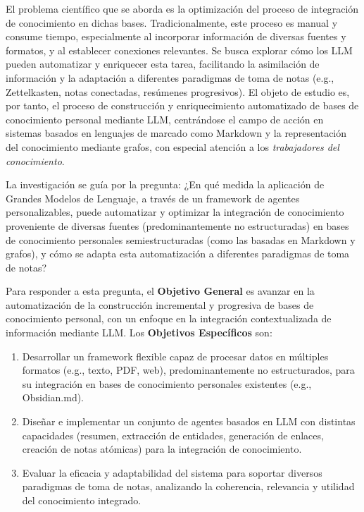 El problema científico que se aborda es la optimización del proceso de integración de conocimiento en dichas bases. Tradicionalmente, este proceso es manual y consume tiempo, especialmente al incorporar información de diversas fuentes y formatos, y al establecer conexiones relevantes. Se busca explorar cómo los LLM pueden automatizar y enriquecer esta tarea, facilitando la asimilación de información y la adaptación a diferentes paradigmas de toma de notas (e.g., Zettelkasten, notas conectadas, resúmenes progresivos). El objeto de estudio es, por tanto, el proceso de construcción y enriquecimiento automatizado de bases de conocimiento personal mediante LLM, centrándose el campo de acción en sistemas basados en lenguajes de marcado como Markdown y la representación del conocimiento mediante grafos, con especial atención a los \textit{trabajadores del conocimiento}.

La investigación se guía por la pregunta: ¿En qué medida la aplicación de Grandes Modelos de Lenguaje, a través de un framework de agentes personalizables, puede automatizar y optimizar la integración de conocimiento proveniente de diversas fuentes (predominantemente no estructuradas) en bases de conocimiento personales semiestructuradas (como las basadas en Markdown y grafos), y cómo se adapta esta automatización a diferentes paradigmas de toma de notas?

Para responder a esta pregunta, el \textbf{Objetivo General} es avanzar en la automatización de la construcción incremental y progresiva de bases de conocimiento personal, con un enfoque en la integración contextualizada de información mediante LLM. Los \textbf{Objetivos Específicos} son:
\begin{enumerate}
    \item Desarrollar un framework flexible capaz de procesar datos en múltiples formatos (e.g., texto, PDF, web), predominantemente no estructurados, para su integración en bases de conocimiento personales existentes (e.g., Obsidian.md).
    \item Diseñar e implementar un conjunto de agentes basados en LLM con distintas capacidades (resumen, extracción de entidades, generación de enlaces, creación de notas atómicas) para la integración de conocimiento.
    \item Evaluar la eficacia y adaptabilidad del sistema para soportar diversos paradigmas de toma de notas, analizando la coherencia, relevancia y utilidad del conocimiento integrado.
\end{enumerate}

